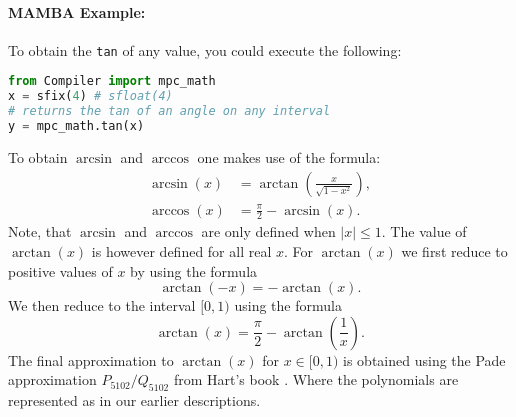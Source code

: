   \paragraph{MAMBA Example:} To obtain the \verb|tan| of any value, you could execute the following:
  \begin{lstlisting}[language={python}]
from Compiler import mpc_math
x = sfix(4) # sfloat(4)
# returns the tan of an angle on any interval
y = mpc_math.tan(x)
\end{lstlisting}

  To obtain  $\arcsin$ and $\arccos$ one makes use of the formula:
  \begin{align*}
    \arcsin (x) & = \arctan \left( \frac{x}{\sqrt{1-x^2}} \right), \\
    \arccos (x) & = \frac{\pi}{2} - \arcsin (x).
  \end{align*}
  Note, that $\arcsin$ and $\arccos$ are only defined when
$|x|\le 1$.
  The value of $\arctan(x)$ is however defined for all real $x$.
  For $\arctan(x)$ we first reduce to positive values of $x$ by using the formula
  \[ \arctan(-x) = - \arctan(x). \]
  We then reduce to the interval $[0,1)$ using the formula
  \[ \arctan(x) = \frac{\pi}{2} - \arctan\left(\frac{1}{x} \right). \]
  The final approximation to $\arctan(x)$ for $x \in [0,1)$
  is obtained using the Pade approximation $P_{5102}/Q_{5102}$
from Hart's book \cite{Hart:1978:CA:540084}.
Where the polynomials are represented as in our earlier
descriptions.
